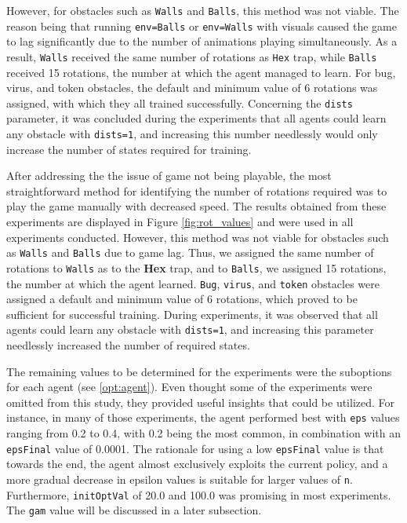 However, for obstacles such as \texttt{Walls} and \texttt{Balls}, this method was not viable. The reason being that running \texttt{env=Balls} or \texttt{env=Walls} with visuals caused the game to lag significantly due to the number of animations playing simultaneously. As a result, \texttt{Walls} received the same number of rotations as \texttt{Hex} trap, while \texttt{Balls} received 15 rotations, the number at which the agent managed to learn. For bug, virus, and token obstacles, the default and minimum value of 6 rotations was assigned, with which they all trained successfully.
Concerning the \texttt{dists} parameter, it was concluded during the experiments that all agents could learn any obstacle with \texttt{dists=1}, and increasing this number needlessly would only increase the number of states required for training. 

After addressing the the issue of game not being playable, the most straightforward method for identifying the number of rotations required was to play the game manually with decreased speed. The results obtained from these experiments are displayed in Figure \ref{fig:rot_values} and were used in all experiments conducted. However, this method was not viable for obstacles such as \texttt{Walls} and \texttt{Balls} due to game lag. Thus, we assigned the same number of rotations to \texttt{Walls} as to the \textbf{Hex} trap, and to \texttt{Balls}, we assigned 15 rotations, the number at which the agent learned. \texttt{Bug}, \texttt{virus}, and \texttt{token} obstacles were assigned a default and minimum value of 6 rotations, which proved to be sufficient for successful training. During experiments, it was observed that all agents could learn any obstacle with \texttt{dists=1}, and increasing this parameter needlessly increased the number of required states.

The remaining values to be determined for the experiments were the suboptions for each agent (see \ref{opt:agent}). Even thought some of the experiments were omitted from this study, they provided useful insights that could be utilized. For instance, in many of those experiments, the agent performed best with \texttt{eps} values ranging from 0.2 to 0.4, with 0.2 being the most common, in combination with an \texttt{epsFinal} value of 0.0001. The rationale for using a low \texttt{epsFinal} value is that towards the end, the agent almost exclusively exploits the current policy, and a more gradual decrease in epsilon values is suitable for larger values of \texttt{n}. Furthermore, \texttt{initOptVal} of 20.0 and 100.0 was promising in most experiments. The \texttt{gam} value will be discussed in a later subsection.

